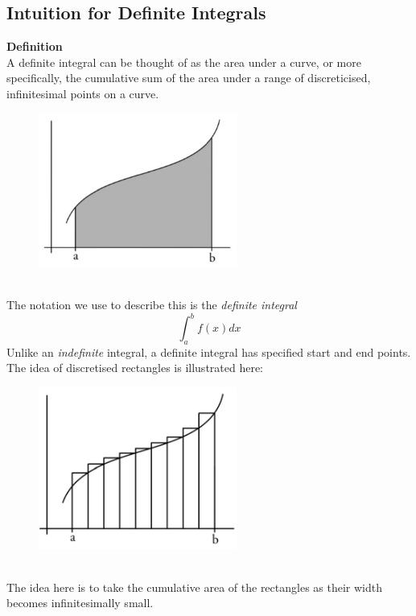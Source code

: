\documentclass{report}
\begin{document}
\subsection{Intuition for Definite Integrals} %
\textbf{Definition}\\
A definite integral can be thought of as the area under a curve,
or more specifically, the cumulative sum of the area under a range of discreticised, 
infinitesimal points on a curve.
\begin{figure}[h]
\includegraphics[width=6.5cm]{Capture25}\\
\centering
{}
\end{figure}\\
The notation we use to describe this is the \textit{definite integral}
\begin{equation*}
\int_a^bf(x)dx
\end{equation*}
Unlike an \textit{indefinite} integral, a definite integral has specified
start and end points.
The idea of discretised rectangles is illustrated here:
\begin{figure}[h]
\includegraphics[width=6.5cm]{Capture26}\\
\centering
{}
\end{figure}\\
The idea here is to take the cumulative area of the rectangles as
their width becomes infinitesimally small.\\
\end{document}
